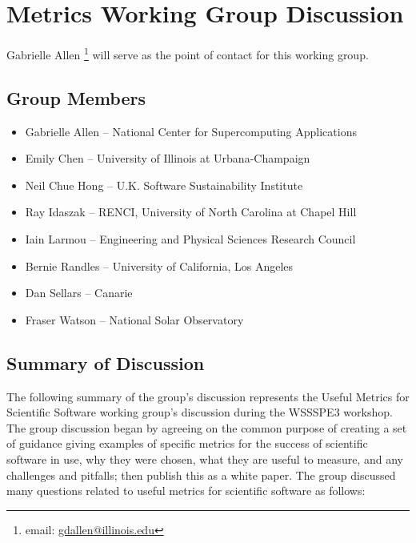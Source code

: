 \section{Metrics Working Group Discussion}
\label{sec:appendix_metrics}

Gabrielle Allen \footnote{email: \href{mailto:gdallen@illinois.edu}{gdallen@illinois.edu}} will serve as the point of contact for this working group.


\subsection{Group Members}

\begin{itemize}
\item Gabrielle Allen -- National Center for Supercomputing Applications
\item Emily Chen -- University of Illinois at Urbana-Champaign
\item Neil Chue Hong -- U.K. Software Sustainability Institute
\item Ray Idaszak -- RENCI, University of North Carolina at Chapel Hill
\item Iain Larmou -- Engineering and Physical Sciences Research Council
\item Bernie Randles -- University of California, Los Angeles
\item Dan Sellars -- Canarie
\item Fraser Watson -- National Solar Observatory
\end{itemize}

\subsection{Summary of Discussion}

The following summary of the group’s discussion represents the Useful Metrics for Scientific Software working group’s discussion during the WSSSPE3 workshop. The group discussion began by agreeing on the common purpose of creating a set of guidance giving examples of specific metrics for the success of scientific software in use, why they were chosen, what they are useful to measure, and any challenges and pitfalls; then publish this as a white paper.  The group discussed many questions related to useful metrics for scientific software as follows: 

